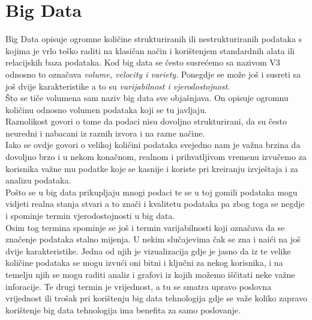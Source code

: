 \documentclass[a4paper,12pt]{foi}
\begin{document}
\chapter{Big Data}
Big Data opisuje ogromne količine strukturiranih ili nestrukturiranih podataka s kojima je vrlo teško raditi na klasičan način i korištenjem standardnih alata ili relacijskih baza podataka. Kod big data se često susrećemo sa nazivom V3 odnosno to označava \textit{volume, velocity i variety}. Ponegdje se može još i susreti sa još dvije karakteristike a to su \textit{varijabilnost i vjerodostojnost}.\\
Što se tiče volumena sam naziv big data sve objašnjava. On opisuje ogromnu količinu odnosno volumen podataka koji se tu javljaju.\\
Raznolikost govori o tome da podaci nisu dovoljno strukturirani, da su često neuredni i nabacani iz raznih izvora i na razne načine.\\
Iako se ovdje govori o velikoj količini podataka svejedno nam je važna brzina da  dovoljno brzo i u nekom konačnom, realnom i prihvatljivom vremenu izvučemo za korisnika važne mu podatke koje se kasnije i koriste pri kreiranju izvještaja i za analizu podataka.\\
Pošto se u big data prikupljaju mnogi podaci te se u toj gomili podataka mogu vidjeti realna stanja stvari a to znači i kvalitetu podataka pa zbog toga se negdje i spominje termin vjerodostojnosti u big data.\\
Osim tog termina spominje se još i termin varijabilnosti koji označava da se značenje podataka stalno mijenja. 
U nekim slučajevima čak se zna i naići na još dvije karakteristike. Jedna od njih je vizualizacija gdje je jasno da iz te velike količine podataka se mogu izvući oni bitni i ključni za nekog korisnika, i na temelju njih se mogu raditi analiz i grafovi iz kojih možemo iščitati neke važne inforacije. Te drugi termin je vrijednost, a tu se smatra upravo poslovna vrijednost ili trošak pri korištenju big data tehnologija gdje se važe koliko zapravo korištenje big data tehnologija ima benefita za samo poslovanje.
\end{document}
